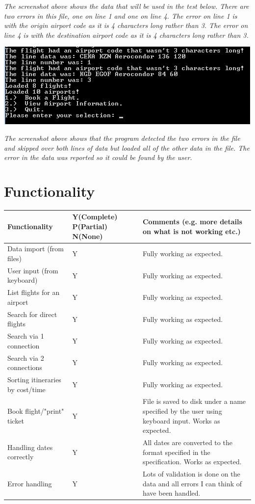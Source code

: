 \documentclass[10pt, a4paper]{article}
\begin{document}
\textit{The screenshot above shows the data that will be used in the test below. There are two errors in this file, one on line 1 and one on line 4. The error on line 1 is with the origin airport code as it is 4 characters long rather than 3. The error on line 4 is with the destination airport code as it is 4 characters long rather than 3.}

\includegraphics{DataValidation6.png}

\textit{The screenshot above shows that the program detected the two errors in the file and skipped over both lines of data but loaded all of the other data in the file. The error in the data was reported so it could be found by the user.}

\section{Functionality}
\begin{table}[h]
\begin{tabular}{|p{150pt} | p{60pt} | p{250pt}|}
\hline
\textbf{Functionality} & \textbf{Y(Complete) P(Partial) N(None)} & \textbf{Comments (e.g. more details on what is not working etc.)} \\ \hline
Data import (from files) & Y & Fully working as expected. \\ \hline
User input (from keyboard) & Y & Fully working as expected. \\ \hline
List flights for an airport & Y & Fully working as expected. \\ \hline
Search for direct flights & Y & Fully working as expected. \\ \hline
Search via 1 connection & Y & Fully working as expected. \\ \hline
Search via 2 connections & Y & Fully working as expected. \\ \hline
Sorting itineraries by cost/time & Y & Fully working as expected. \\ \hline
Book flight/"print" ticket & Y & File is saved to disk under a name specified by the user using keyboard input. Works as expected. \\ \hline
Handling dates correctly & Y & All dates are converted to the format specified in the specification. Works as expected. \\ \hline
Error handling & Y & Lots of validation is done on the data and all errors I can think of have been handled. \\ \hline
\end{tabular}
\end{table}
\end{document}
